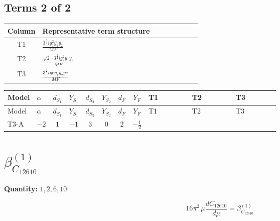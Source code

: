 \documentclass[8pt]{article}
\begin{document}
\begin{landscape}
\subsection*{Terms 2 of 2}
\begin{center}
\begin{tabular}{@{}c >{\raggedright\arraybackslash}p{0.82\linewidth}@{}}
\toprule
Column & Representative term structure \\
\midrule
T1 & \(\displaystyle \frac{3^{\frac{3}{4}} i g_{1}^{2} \overline{y_{1}} \overline{y_{2}}}{MF}\) \\
\midrule
T2 & \(\displaystyle \frac{\sqrt{2} \cdot 3^{\frac{3}{4}} i g_{2}^{2} \overline{y_{1}} \overline{y_{2}}}{MF}\) \\
\midrule
T3 & \(\displaystyle \frac{3^{\frac{3}{4}} i ye \overline{y_{1}} \overline{y_{2}} \overline{ye}}{MF}\) \\
\midrule
\bottomrule
\end{tabular}
\end{center}
\smallskip
\tiny
\begin{longtable}{@{}llcccccc >{\raggedright\arraybackslash}p{0.21\linewidth} >{\raggedright\arraybackslash}p{0.21\linewidth} >{\raggedright\arraybackslash}p{0.21\linewidth}@{}}
\toprule
Model & $\alpha$ & $d_{S_1}$ & $Y_{S_1}$ & $d_{S_2}$ & $Y_{S_2}$ & $d_F$ & $Y_F$ & T1 & T2 & T3 \\
\midrule
\endfirsthead
\toprule
Model & $\alpha$ & $d_{S_1}$ & $Y_{S_1}$ & $d_{S_2}$ & $Y_{S_2}$ & $d_F$ & $Y_F$ & T1 & T2 & T3 \\
\midrule
\endhead
T3-A & $-2$ & $1$ & $-1$ & $3$ & $0$ & $2$ & $-\frac{1}{2}$ & \scriptsize\adjustbox{max width=\linewidth}{$\begin{gathered} - \frac{3^{\frac{3}{4}} i g_{1}^{2} \overline{y_{1}} \overline{y_{2}}}{8 MF}\end{gathered}$} & \scriptsize\adjustbox{max width=\linewidth}{$\begin{gathered} - \frac{\sqrt{2} \cdot 3^{\frac{3}{4}} i g_{2}^{2} \overline{y_{1}} \overline{y_{2}}}{6 MF}\end{gathered}$} & \scriptsize\adjustbox{max width=\linewidth}{$\begin{gathered} \frac{3^{\frac{3}{4}} i ye \overline{y_{1}} \overline{y_{2}} \overline{ye}}{12 MF}\end{gathered}$} \\
\midrule
\bottomrule
\end{longtable}
\clearpage
\section*{$\beta_{C_{12610}}^{(1)}$}
\noindent\textbf{Quantity: }$\mathrm{1,2,6,10}$\par\smallskip
\[16\pi^2\,\mu\frac{d C_{12610}}{d\mu}=\beta_{C_{12610}}^{(1)}\]

\end{landscape}
\end{document}
